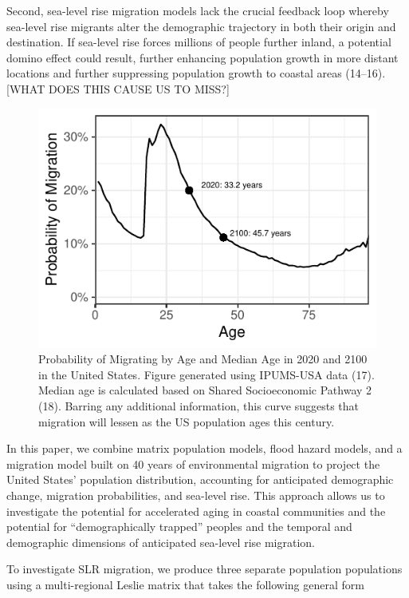 \documentclass[9pt,twocolumn,twoside,]{pnas-new}
\begin{document}
Second, sea-level rise migration models lack the crucial feedback loop
whereby sea-level rise migrants alter the demographic trajectory in both
their origin and destination. If sea-level rise forces millions of
people further inland, a potential domino effect could result, further
enhancing population growth in more distant locations and further
suppressing population growth to coastal areas (14--16). {[}WHAT DOES
THIS CAUSE US TO MISS?{]}

\begin{figure}
\centering
\includegraphics{FigProbMig.pdf}
\caption{Probability of Migrating by Age and Median Age in 2020 and 2100
in the United States. Figure generated using IPUMS-USA data (17). Median
age is calculated based on Shared Socioeconomic Pathway 2 (18). Barring
any additional information, this curve suggests that migration will
lessen as the US population ages this century.}
\end{figure}

In this paper, we combine matrix population models, flood hazard models,
and a migration model built on 40 years of environmental migration to
project the United States' population distribution, accounting for
anticipated demographic change, migration probabilities, and sea-level
rise. This approach allows us to investigate the potential for
accelerated aging in coastal communities and the potential for
``demographically trapped'' peoples and the temporal and demographic
dimensions of anticipated sea-level rise migration.

To investigate SLR migration, we produce three separate population
populations using a multi-regional Leslie matrix that takes the
following general form
\end{document}
